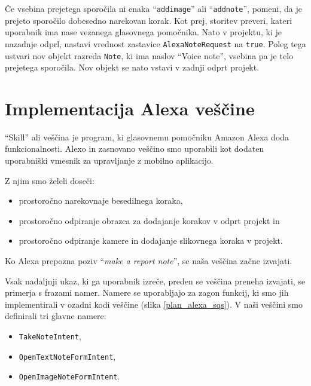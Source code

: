 \documentclass[a4paper, 12pt]{book}
\begin{document}
Če vsebina prejetega sporočila ni enaka \enquote{\texttt{addimage}} ali \enquote{\texttt{addnote}}, pomeni, da je prejeto sporočilo dobesedno narekovan korak.
Kot prej, storitev preveri, kateri uporabnik ima nase vezanega glasovnega pomočnika.
Nato v projektu, ki je nazadnje odprl, nastavi vrednost zastavice \texttt{AlexaNoteRequest} na \texttt{true}.
Poleg tega ustvari nov objekt razreda \texttt{Note}, ki ima naslov \enquote{Voice note}, vsebina pa je telo prejetega sporočila.
Nov objekt se nato vstavi v zadnji odprt projekt.



\section{Implementacija Alexa veščine}

\enquote{Skill} ali veščina je program, ki glasovnemu pomočniku Amazon Alexa doda funkcionalnosti.
Alexo in zasnovano veščino smo uporabili kot dodaten uporabniški vmesnik za upravljanje z mobilno aplikacijo.

\noindent Z njim smo želeli doseči:
\begin{itemize}
	\item prostoročno narekovnaje besedilnega koraka,
	\item prostoročno odpiranje obrazca za dodajanje korakov v odprt projekt in
	\item prostoročno odpiranje kamere in dodajanje slikovnega koraka v projekt.
\end{itemize}



Ko Alexa prepozna poziv \enquote{\textit{make a report note}}, se naša veščina začne izvajati.

Vsak nadaljnji ukaz, ki ga uporabnik izreče, preden se veščina preneha izvajati, se primerja s frazami namer.
Namere se uporabljajo za zagon funkcij, ki smo jih implementirali v ozadni kodi veščine (slika \ref{plan_alexa_sqs}).
V naši veščini smo definirali tri glavne namere:

\begin{itemize}
	\item \texttt{TakeNoteIntent},
	\item \texttt{OpenTextNoteFormIntent},
	\item \texttt{OpenImageNoteFormIntent}.
\end{itemize}
\end{document}
